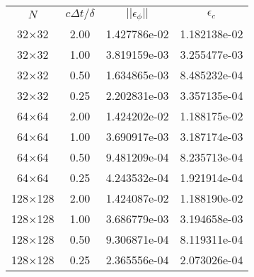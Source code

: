 \begin{tabular}{cccc}
     $N$ & $c\Delta t/\delta$  & $||\epsilon_{\phi}||$ & $\epsilon_{c}$  \\
32$\times$32 & 2.00 & 1.427786e-02 & 1.182138e-02  \\
32$\times$32 & 1.00 & 3.819159e-03 & 3.255477e-03  \\
32$\times$32 & 0.50 & 1.634865e-03 & 8.485232e-04  \\
32$\times$32 & 0.25 & 2.202831e-03 & 3.357135e-04  \\
64$\times$64 & 2.00 & 1.424202e-02 & 1.188175e-02  \\
64$\times$64 & 1.00 & 3.690917e-03 & 3.187174e-03  \\
64$\times$64 & 0.50 & 9.481209e-04 & 8.235713e-04  \\
64$\times$64 & 0.25 & 4.243532e-04 & 1.921914e-04  \\
128$\times$128 & 2.00 & 1.424087e-02 & 1.188190e-02  \\
128$\times$128 & 1.00 & 3.686779e-03 & 3.194658e-03  \\
128$\times$128 & 0.50 & 9.306871e-04 & 8.119311e-04  \\
128$\times$128 & 0.25 & 2.365556e-04 & 2.073026e-04  \\
\end{tabular}
